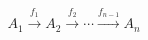 \documentclass[preview]{standalone}
\begin{document}
\begin{align*}
A_1 \xrightarrow{f_1} A_2 \xrightarrow{f_2} \cdots \xrightarrow{f_{n-1}} A_n
\end{align*}
\end{document}
